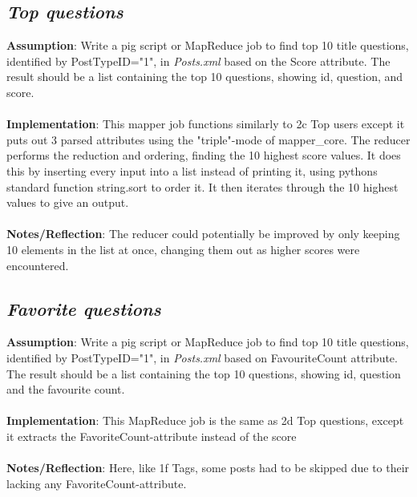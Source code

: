 \documentclass[fleqn,10pt]{wlscirep}
\begin{document}
\subsection{\emph{Top questions}}
\textbf{Assumption}: Write a pig script or MapReduce job to find top 10 title questions, identified by PostTypeID="1", in \textit{Posts.xml} based on the Score attribute. The result should be a list containing the top 10 questions, showing id, question, and score.\\ \\
\textbf{Implementation}: This mapper job functions similarly to 2c Top users except it puts out 3 parsed attributes using the "triple"-mode of mapper\_core. The reducer performs the reduction and ordering, finding the 10 highest score values. It does this by inserting every input into a list instead of printing it, using pythons standard function string.sort to order it. It then iterates through the 10 highest values to give an output.\\ \\
\textbf{Notes/Reflection}: The reducer could potentially be improved by only keeping 10 elements in the list at once, changing them out as higher scores were encountered.


\subsection{\emph{Favorite questions}}
\textbf{Assumption}: Write a pig script or MapReduce job to find top 10 title questions, identified by PostTypeID="1", in \textit{Posts.xml} based on FavouriteCount attribute. The result should be a list containing the top 10 questions, showing id, question and the favourite count. \\ \\
\textbf{Implementation}: This MapReduce job is the same as 2d Top questions, except it extracts the FavoriteCount-attribute instead of the score \\ \\
\textbf{Notes/Reflection}: Here, like 1f Tags, some posts had to be skipped due to their lacking any FavoriteCount-attribute.

\end{document}
